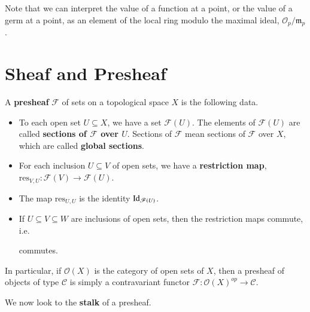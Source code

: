 Note that we can interpret the value of a function at a point, or the value of a germ at a point, as an element of the local ring modulo the maximal ideal, $\mathscr{O}_p/\mathfrak{m}_p$.

\section{Sheaf and Presheaf}

\begin{definition}
    A \textbf{presheaf} $\mathscr{F}$ of sets on a topological space $X$ is the following data. \begin{itemize}
        \item To each open set $U \subseteq X$, we have a set $\mathscr{F}(U)$. The elements of $\mathscr{F}(U)$ are called \textbf{sections of $\mathscr{F}$ over $U$}. Sections of $\mathscr{F}$ mean sections of $\mathscr{F}$ over $X$, which are called \textbf{global sections}.
        \item For each inclusion $U \subseteq V$ of open sets, we have a \textbf{restriction map}, $\text{res}_{V,U}:\mathscr{F}(V)\rightarrow \mathscr{F}(U)$.
        \item The map $\text{res}_{U,U}$ is the identity $\operatorname{Id}_{\mathscr{F}(U)}$.
        \item If $U \subseteq V \subseteq W$ are inclusions of open sets, then the restriction maps commute, i.e.
\begin{center}
\end{center}
commutes.
    \end{itemize}
\end{definition}

In particular, if $\mathcal{O}(X)$ is the category of open sets of $X$, then a presheaf of objects of type $\mathscr{C}$ is simply a contravariant functor $\mathscr{F}:\mathcal{O}(X)^{op}\rightarrow \mathscr{C}$.

We now look to the \textbf{stalk} of a presheaf.

